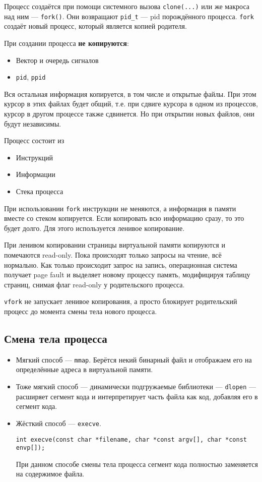 Процесс создаётся при помощи системного вызова \verb!clone(...)! или же макроса над ним --- \verb!fork()!. Они возвращают \verb!pid_t! --- pid порождённого процесса. \verb!fork! создаёт новый процесс, который является копией родителя.

При создании процесса \textbf{не копируются}:
\begin{itemize}
\item Вектор и очередь сигналов
\item \verb!pid!, \verb!ppid!
\end{itemize}

Вся остальная информация копируется, в том числе и открытые файлы. При этом курсор в этих файлах будет общий, т.е. при сдвиге курсора в одном из процессов, курсор в другом процессе также сдвинется. Но при открытии новых файлов, они будут независимы.

Процесс состоит из
\begin{itemize}
\item Инструкций
\item Информации
\item Стека процесса
\end{itemize}

При использовании \verb!fork! инструкции не меняются, а информация в памяти вместе со стеком копируется. Если копировать всю информацию сразу, то это будет долго. Для этого используется ленивое копирование.

При ленивом копировании страницы виртуальной памяти копируются и помечаются read-only. Пока происходят только запросы на чтение, всё нормально. Как только происходит запрос на запись, операционная система получает page fault и выделяет новому процессу память, модифицируя таблицу страниц, снимая флаг read-only у родительского процесса.

\verb!vfork! не запускает ленивое копирования, а просто блокирует родительский процесс до момента смены тела нового процесса.

\subsection{Смена тела процесса}

\begin{itemize}
\item Мягкий способ --- \verb!mmap!. Берётся некий бинарный файл и отображаем его на определённые адреса в виртуальной памяти.
\item Тоже мягкий способ --- динамически подгружаемые библиотеки --- \verb!dlopen! --- расширяет сегмент кода и интерпретирует часть файла как код, добавляя его в сегмент кода.
\item Жёсткий способ --- \verb!execve!.
\begin{verbatim}
int execve(const char *filename, char *const argv[], char *const envp[]);
\end{verbatim}
При данном способе смены тела процесса сегмент кода полностью заменяется на содержимое файла.
\end{itemize}

